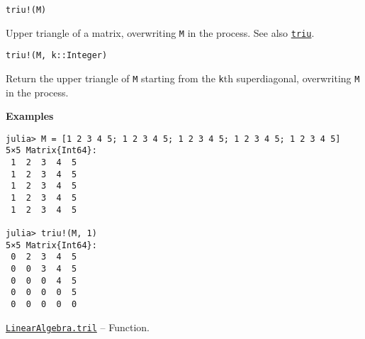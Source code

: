 \begin{adjustwidth}{2em}{0pt}


\begin{verbatim}
triu!(M)
\end{verbatim}

Upper triangle of a matrix, overwriting \texttt{M} in the process. See also \hyperlink{13861148483706203681}{\texttt{triu}}.




\begin{lstlisting}
triu!(M, k::Integer)
\end{lstlisting}

Return the upper triangle of \texttt{M} starting from the \texttt{k}th superdiagonal, overwriting \texttt{M} in the process.

\textbf{Examples}


\begin{verbatim}
julia> M = [1 2 3 4 5; 1 2 3 4 5; 1 2 3 4 5; 1 2 3 4 5; 1 2 3 4 5]
5×5 Matrix{Int64}:
 1  2  3  4  5
 1  2  3  4  5
 1  2  3  4  5
 1  2  3  4  5
 1  2  3  4  5

julia> triu!(M, 1)
5×5 Matrix{Int64}:
 0  2  3  4  5
 0  0  3  4  5
 0  0  0  4  5
 0  0  0  0  5
 0  0  0  0  0
\end{verbatim}



\end{adjustwidth}
\hypertarget{6919124555890239966}{}
\hyperlink{6919124555890239966}{\texttt{LinearAlgebra.tril}}  -- {Function.}

